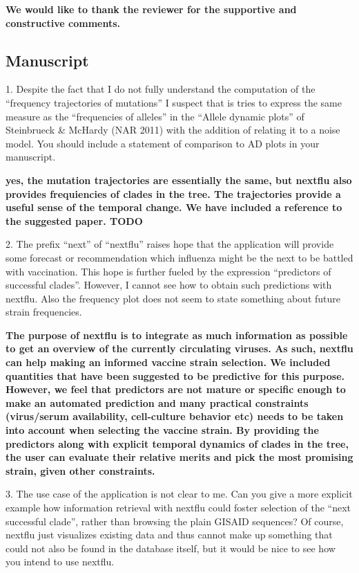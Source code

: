 \documentclass[11pt,oneside,letterpaper]{article}
\begin{document}
{\bf We would like to thank the reviewer for the supportive and constructive comments.}

\subsection*{Manuscript}

1. Despite the fact that I do not fully understand the computation of the ``frequency trajectories of mutations'' I suspect that is tries to express the same measure as the ``frequencies of alleles'' in the ``Allele dynamic plots'' of Steinbrueck \& McHardy (NAR 2011) with the addition of relating it to a noise model. You should include a statement of comparison to AD  plots in your manuscript.

{\bf yes, the mutation trajectories are essentially the same, but nextflu also provides frequiencies of clades in the tree. The trajectories provide a useful sense of the temporal change. We have included a reference to the suggested paper. TODO}

2. The prefix ``next'' of ``nextflu'' raises hope that the application will provide some forecast or recommendation which influenza might be the next to be battled with vaccination. This hope is further fueled by the expression ``predictors of successful clades''. However, I cannot see how to obtain such predictions with nextflu. Also the frequency plot does not seem to state something about future strain frequencies.

{\bf The purpose of nextflu is to integrate as much information as possible to get an overview of the currently circulating viruses. As such, nextflu can help making an informed vaccine strain selection. We included quantities that have been suggested to be predictive for this purpose. However, we feel that predictors are not mature or specific enough to make an automated prediction and many practical constraints (virus/serum availability, cell-culture behavior etc) needs to be taken into account when selecting the vaccine strain. By providing the predictors along with explicit temporal dynamics of clades in the tree, the user can evaluate their relative merits and pick the most promising strain, given other constraints.}

3. The use case of the application is not clear to me. Can you give a more explicit example how information retrieval with nextflu could foster selection of the ``next successful clade'', rather than browsing the plain GISAID sequences? Of course, nextflu just visualizes existing data and thus cannot make up something that could not also be found in the database itself, but it would be nice to see how you intend to use nextflu.
\end{document}
